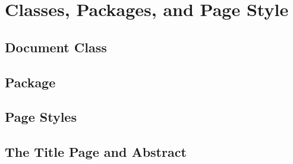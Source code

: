 \section{Classes, Packages, and Page Style}
\subsection{Document Class}


\subsection{Package}


\subsection{Page Styles}


\subsection{The Title Page and Abstract}
\newpage